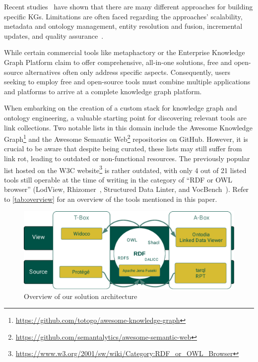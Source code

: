 \documentclass[
hf
]{ceurart}
\begin{document}
Recent studies~\cite{Hur2021, hitzler_review_2021, zhu_multi-modal_2022, ryen_building_2022, tamasauskaite_defining_2023} have shown that there are many different approaches for building specific KGs. Limitations are often faced regarding the approaches' scalability, metadata and ontology management, entity resolution and fusion, incremental updates, and quality assurance~\cite{Hofer2023}. 

While certain commercial tools like metaphactory or the Enterprise Knowledge Graph Platform claim to offer comprehensive, all-in-one solutions, free and open-source alternatives often only address specific aspects. Consequently, users seeking to employ free and open-source tools must combine multiple applications and platforms to arrive at a complete knowledge graph platform. 

When embarking on the creation of a custom stack for knowledge graph and ontology engineering, a valuable starting point for discovering relevant tools are link collections. Two notable lists in this domain include the Awesome Knowledge Graph\footnote{\url{https://github.com/totogo/awesome-knowledge-graph}} and the Awesome Semantic Web\footnote{\url{https://github.com/semantalytics/awesome-semantic-web}} repositories on GitHub. However, it is crucial to be aware that despite being curated, these lists may still suffer from link rot, leading to outdated or non-functional resources.
%
The previously popular list hosted on the W3C website\footnote{\url{https://www.w3.org/2001/sw/wiki/Category:RDF_or_OWL_Browser}} is rather outdated, with only 4 out of 21 listed tools still operable at the time of writing in the category of ``RDF or OWL browser''  (LodView, Rhizomer~\cite{garcia2022rhizomer}, Structured Data Linter, and VocBench~\cite{stellato2020vocbench}).
%
Refer to \autoref{tab:overview} for an overview of the tools mentioned in this paper.

\begin{figure}
    \centering
    \includegraphics[width=.9\textwidth]{overview_coy_rdf.pdf}
    \caption{Overview of our solution architecture}
    \label{fig:architecture}
\end{figure}
\end{document}
